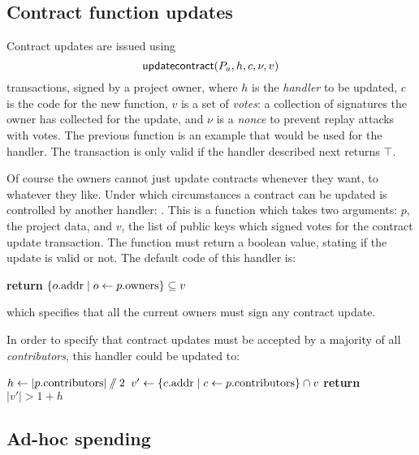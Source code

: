 \subsection{Contract function updates}

Contract updates are issued using
\[
    \mathsf{updatecontract}\lparen P_a, h, c, \nu, v\rparen
\]
transactions, signed by a project owner, where $h$ is the \emph{handler} to be
updated, $c$ is the code for the new function, $v$ is a set of \emph{votes}: a
collection of signatures the owner has collected for the update, and $\nu$ is a
\emph{nonce} to prevent replay attacks with votes. The previous function is an
example that would be used for the  handler. The
transaction is only valid if the  handler
described next returns $\top$.

Of course the owners cannot just update contracts whenever they want, to
whatever they like. Under which circumstances a contract can be updated is
controlled by another handler: . This is a
function which takes two arguments: $p$, the project data, and $v$, the list of
public keys which signed votes for the contract update transaction. The
function must return a boolean value, stating if the update is valid or not.
The default code of this handler is:
\begin{algorithmic}[0]
        \State \textbf{return} $\{ o.{\mathrm{addr}} \mid o \gets p.{\mathrm{owners}} \} \subseteq v$
    \EndProcedure
\end{algorithmic}
which specifies that all the current owners must sign any contract update.

In order to specify that contract updates must be accepted by a majority of all
\emph{contributors}, this handler could be updated to:
\medskip
\begin{algorithmic}[0]
        \State $h \gets |p.{\mathrm{contributors}}| \sslash 2$
        \State $v' \gets \{ c.{\mathrm{addr}} \mid c \gets p.{\mathrm{contributors}} \} \cap v$
        \State \textbf{return} $|v'| > 1 + h$
    \EndProcedure
\end{algorithmic}


\subsection{Ad-hoc spending}


